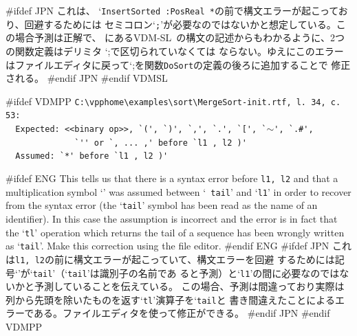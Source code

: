 \documentclass[\pformat,12pt]{article}
\newcommand{\vdmslpp}{VDM-SL}
\newcommand{\vdmslpp}{VDM++}
\newcommand{\Lit}[1]{`#1\Quote}
\newcommand{\aaa}{\tt }
\begin{document}
#ifdef JPN
これは、 `{\tt InsertSorted :PosReal *}の前で構文エラーが起こっており、回避するためには
セミコロン`{\tt ;}'が必要なのではないかと想定している。この場合予測は正解で、 \cite{UMLMan-CSK}
にある\vdmslpp\ の構文の記述からもわかるように、2つの関数定義はデリミタ \Lit{;}で区切られていなくては
ならない。ゆえにこのエラーはファイルエディタに戻って\Lit{;}を関数{\aaa DoSort}の定義の後ろに追加することで
修正される。
#endif JPN
#endif VDMSL

#ifdef VDMPP
\verb!C:\vpphome\examples\sort\MergeSort-init.rtf, l. 34, c. 53:! \\
 \verb!  Expected: <<binary op>>, `(', `)', `,', `.', `[', `!{\tt $\sim$}\verb!', `.#',! \\
 \verb!              `'' or `, ... ,' before `l1 , l2 )'! \\
 \verb!  Assumed: `*' before `l1 , l2 )'!

#ifdef ENG
This tells us that there is a syntax error before {\tt l1, l2} and
that  a multiplication symbol `{\tt *}' was assumed between `{\tt
  tail}' and `{\tt l1}' in order to recover from the syntax error (the
`{\tt tail}' symbol has been read as the name of an identifier). In
this case the assumption is incorrect and the error is in fact that
the `{\tt tl}' operation which returns the tail of a sequence has been
wrongly written as `{\tt tail}'. Make this correction using the file
editor.
#endif ENG
#ifdef JPN
これは{\tt l1, l2}の前に構文エラーが起こっていて、構文エラーを回避
するためには記号`{\tt *}'が`{\tt tail}'（`{\tt tail}'は識別子の名前であ
ると予測）と`{\tt l1}'の間に必要なのではないかと予測していることを伝えている。
この場合、予測は間違っており実際は列から先頭を除いたものを返す`{\tt tl}'演算子を`{\tt tail}と
書き間違えたことによるエラーである。ファイルエディタを使って修正ができる。
#endif JPN
#endif VDMPP
\end{document}
